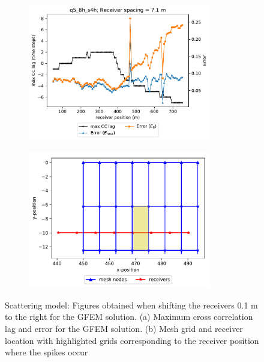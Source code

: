 \begin{figure}[h!]
 		\centering
		\begin{subfigure}{8cm}
				\includegraphics[width=8cm, height=6cm]{Thesis_Edith/figures/scattering/appendix/spike7_1.pdf}
			     \caption{}
		\end{subfigure}
        \hspace{0.25cm}
		\begin{subfigure}{8cm}
				\includegraphics[width=8cm, height=6cm]{Thesis_Edith/figures/scattering/appendix/receiver-spacing3_v2.pdf}
			   \caption{}
		\end{subfigure}
 
	\caption{Scattering model: Figures obtained when shifting the receivers 0.1 m to the right for the GFEM solution. (a) Maximum cross correlation lag and error for the GFEM solution. (b) Mesh grid and receiver location with highlighted grids corresponding to the receiver position where the spikes occur}  
	\label{fig:a.3}
\end{figure}

